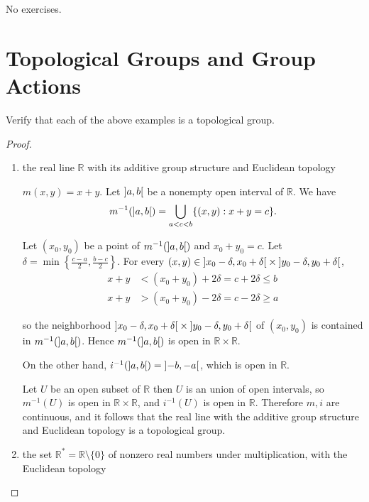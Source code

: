 No exercises.

\section*{Topological Groups and Group Actions}

\begin{exercise}{3.83}
	Verify that each of the above examples is a topological group.
\end{exercise}

\begin{proof}
	\begin{enumerate}[label={(\alph*)}]
		\item the real line $\mathbb{R}$ with its additive group structure and Euclidean topology

		      $m(x, y) = x + y$. Let $\left]{a, b}\right[$ be a nonempty open interval of $\mathbb{R}$. We have
		      \[
			      m^{-1}(\left]{a,b}\right[) = \bigcup_{a < c < b}\{ (x, y): x + y = c \}.
		      \]

		      Let $(x_{0}, y_{0})$ be a point of $m^{-1}(\left]{a,b}\right[)$ and $x_{0} + y_{0} = c$. Let $\delta = \min\left\{ \frac{c-a}{2}, \frac{b-c}{2} \right\}$. For every $(x, y)\in \left]{x_{0} - \delta, x_{0} + \delta}\right[\times\left]{y_{0} - \delta, y_{0} + \delta}\right[$,
		      \begin{align*}
			      x + y & < (x_{0} + y_{0}) + 2\delta = c + 2\delta \leq b \\
			      x + y & > (x_{0} + y_{0}) - 2\delta = c - 2\delta \geq a
		      \end{align*}

		      so the neighborhood $\left]{x_{0} - \delta, x_{0} + \delta}\right[\times\left]{y_{0} - \delta, y_{0} + \delta}\right[$ of $(x_{0}, y_{0})$ is contained in $m^{-1}(\left]{a, b}\right[)$. Hence $m^{-1}(\left]{a, b}\right[)$ is open in $\mathbb{R}\times\mathbb{R}$.

		      On the other hand, $i^{-1}(\left]{a, b}\right[) = \left]{-b, -a}\right[$, which is open in $\mathbb{R}$.

		      Let $U$ be an open subset of $\mathbb{R}$ then $U$ is an union of open intervals, so $m^{-1}(U)$ is open in $\mathbb{R}\times\mathbb{R}$, and $i^{-1}(U)$ is open in $\mathbb{R}$. Therefore $m, i$ are continuous, and it follows that the real line with the additive group structure and Euclidean topology is a topological group.
		\item the set $\mathbb{R}^{*} = \mathbb{R}\setminus\{0\}$ of nonzero real numbers under multiplication, with the Euclidean topology


\end{enumerate}
\end{proof}
